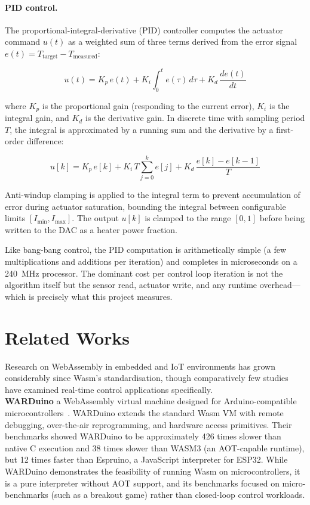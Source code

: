 \documentclass[12pt, a4paper]{report}
\begin{document}
\paragraph{PID control.} The proportional-integral-derivative (PID) controller computes the actuator command $u(t)$ as a weighted sum of three terms derived from the error signal $e(t) = T_{\text{target}} - T_{\text{measured}}$:

\begin{equation}
\label{eq:pid}
u(t) = K_p \, e(t) + K_i \int_0^t e(\tau) \, d\tau + K_d \, \frac{de(t)}{dt}
\end{equation}

\noindent where $K_p$ is the proportional gain (responding to the current error), $K_i$ is the integral gain, and $K_d$ is the derivative gain. In discrete time with sampling period $T$, the integral is approximated by a running sum and the derivative by a first-order difference:

\begin{equation}
\label{eq:pid-discrete}
u[k] = K_p \, e[k] + K_i \, T \sum_{j=0}^{k} e[j] + K_d \, \frac{e[k] - e[k-1]}{T}
\end{equation}

Anti-windup clamping is applied to the integral term to prevent accumulation of error during actuator saturation, bounding the integral between configurable limits $[I_{\min}, I_{\max}]$. The output $u[k]$ is clamped to the range $[0, 1]$ before being written to the DAC as a heater power fraction.

Like bang-bang control, the PID computation is arithmetically simple (a few multiplications and additions per iteration) and completes in microseconds on a 240~MHz processor. The dominant cost per control loop iteration is not the algorithm itself but the sensor read, actuator write, and any runtime overhead---which is precisely what this project measures.

\section{Related Works}
\label{sec:related}

Research on WebAssembly in embedded and IoT environments has grown considerably since
Wasm's standardisation, though comparatively few studies have examined real-time control
applications specifically. \\

\textbf{WARDuino }a
WebAssembly virtual machine designed for Arduino-compatible
microcontrollers~\cite{warduino2024}. WARDuino extends the standard Wasm VM with remote
debugging, over-the-air reprogramming, and hardware access primitives. Their benchmarks
showed WARDuino to be approximately 426 times slower than native C execution and 38 times
slower than WASM3 (an AOT-capable runtime), but 12 times faster than Espruino, a JavaScript
interpreter for ESP32. While WARDuino demonstrates the feasibility of running Wasm on
microcontrollers, it is a pure interpreter without AOT support, and its benchmarks focused
on micro-benchmarks (such as a breakout game) rather than closed-loop control workloads. \\
\end{document}
